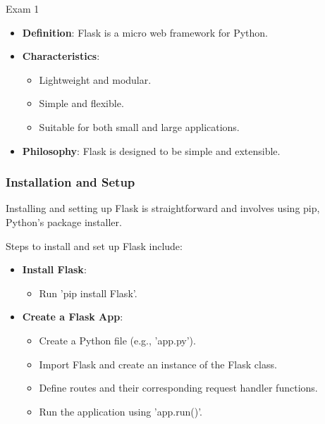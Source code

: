 \begin{examnotes}{Exam 1}
\begin{highlight}
        \begin{itemize}
            \item \textbf{Definition}: Flask is a micro web framework for Python.
            \item \textbf{Characteristics}:
                \begin{itemize}
                    \item Lightweight and modular.
                    \item Simple and flexible.
                    \item Suitable for both small and large applications.
                \end{itemize}
            \item \textbf{Philosophy}: Flask is designed to be simple and extensible.
        \end{itemize}
    \end{highlight}
    
    \subsubsection*{Installation and Setup}
    
    Installing and setting up Flask is straightforward and involves using pip, Python's package installer.
    
    \begin{highlight}
        Steps to install and set up Flask include:
        
        \begin{itemize}
            \item \textbf{Install Flask}:
                \begin{itemize}
                    \item Run 'pip install Flask'.
                \end{itemize}
            \item \textbf{Create a Flask App}:
                \begin{itemize}
                    \item Create a Python file (e.g., 'app.py').
                    \item Import Flask and create an instance of the Flask class.
                    \item Define routes and their corresponding request handler functions.
                    \item Run the application using 'app.run()'.
                \end{itemize}
        \end{itemize}
    \end{highlight}
    

\end{examnotes}
